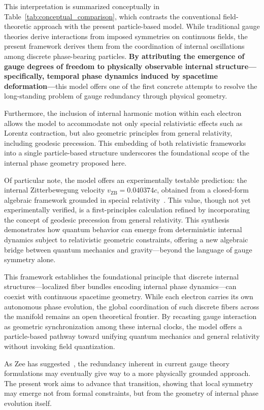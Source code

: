 \documentclass[%
 reprint,
 amsmath,amssymb,
 aps,
]{revtex4-1}
\numberwithin{equation}{section}%
\begin{document}
This interpretation is summarized conceptually in Table~\ref{tab:conceptual_comparison}, which contrasts the conventional field-theoretic approach with the present particle-based model. While traditional gauge theories derive interactions from imposed symmetries on continuous fields, the present framework derives them from the coordination of internal oscillations among discrete phase-bearing particles. \textbf{By attributing the emergence of gauge degrees of freedom to physically observable internal structure---specifically, temporal phase dynamics induced by spacetime deformation---}this model offers one of the first concrete attempts to resolve the long-standing problem of gauge redundancy through physical geometry.

Furthermore, the inclusion of internal harmonic motion within each electron allows the model to accommodate not only special relativistic effects such as Lorentz contraction, but also geometric principles from general relativity, including geodesic precession. This embedding of both relativistic frameworks into a single particle-based structure underscores the foundational scope of the internal phase geometry proposed here.

Of particular note, the model offers an experimentally testable prediction: the internal Zitterbewegung velocity $v_{\text{ZB}} = 0.040374c$, obtained from a closed-form algebraic framework grounded in special relativity~\cite{hanamura2025bridging}. This value, though not yet experimentally verified, is a first-principles calculation refined by incorporating the concept of geodesic precession from general relativity. This synthesis demonstrates how quantum behavior can emerge from deterministic internal dynamics subject to relativistic geometric constraints, offering a new algebraic bridge between quantum mechanics and gravity—beyond the language of gauge symmetry alone.

This framework establishes the foundational principle that discrete internal structures---localized fiber bundles encoding internal phase dynamics---can coexist with continuous spacetime geometry. While each electron carries its own autonomous phase evolution, the global coordination of such discrete fibers across the manifold remains an open theoretical frontier. By recasting gauge interaction as geometric synchronization among these internal clocks, the model offers a particle-based pathway toward unifying quantum mechanics and general relativity without invoking field quantization.

As Zee has suggested~\cite{zee2010}, the redundancy inherent in current gauge theory formulations may eventually give way to a more physically grounded approach. The present work aims to advance that transition, showing that local symmetry may emerge not from formal constraints, but from the geometry of internal phase evolution itself.
\end{document}
